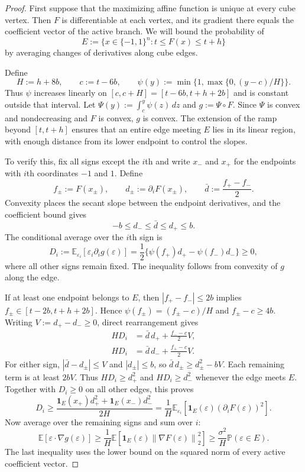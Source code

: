 \documentclass[11pt,letterpaper]{article}
\theoremstyle{remark}
\newcommand{\E}{\mathbb E}
\newcommand{\Pp}{\mathbb P}
\newcommand{\norm}[1]{\left\lVert#1\right\rVert}
\newcommand{\ind}{\mathbf 1}
\begin{document}
\begin{proof}
First suppose that the maximizing affine function is unique at every
cube vertex. Then $F$ is differentiable at each vertex, and its
gradient there equals the coefficient vector of the active branch.
We will bound the probability of
\[
 E:=\{x\in\{-1,1\}^n:t\le F(x)\le t+h\}
\]
by averaging changes of derivatives along cube edges.

Define
\[
 H:=h+8b,\qquad c:=t-6b,\qquad
 \psi(y):=\min\{1,\max\{0,(y-c)/H\}\}.
\]
Thus $\psi$ increases linearly on
$[c,c+H]=[t-6b,t+h+2b]$ and is constant outside that interval.
Let $\Psi(y):=\int_c^y\psi(z)\,dz$ and $g:=\Psi\circ F$.
Since $\Psi$ is convex and nondecreasing and $F$ is convex,
$g$ is convex. The extension of the ramp beyond $[t,t+h]$
ensures that an entire edge meeting $E$ lies in its linear region,
with enough distance from its lower endpoint to control the slopes.

To verify this, fix all signs except the $i$th and write $x_-$
and $x_+$ for the endpoints with $i$th coordinates $-1$ and $1$.
Define
\[
 f_\pm:=F(x_\pm),\qquad
 d_\pm:=\partial_iF(x_\pm),\qquad
 \bar d:=\frac{f_+-f_-}{2}.
\]
Convexity places the secant slope between the endpoint derivatives,
and the coefficient bound gives
\[
 -b\le d_-\le\bar d\le d_+\le b.
\]
The conditional average over the $i$th sign is
\[
 D_i:=\E_{\varepsilon_i}[
       \varepsilon_i\partial_i g(\varepsilon)]
 =\frac12\{\psi(f_+)d_+-\psi(f_-)d_-\}\ge0,
\]
where all other signs remain fixed. The inequality follows from
convexity of $g$ along the edge.

If at least one endpoint belongs to $E$, then
$|f_+-f_-|\le2b$ implies
$f_\pm\in[t-2b,t+h+2b]$. Hence
$\psi(f_\pm)=(f_\pm-c)/H$ and $f_\pm-c\ge4b$.
Writing $V:=d_+-d_-\ge0$, direct rearrangement gives
\[
 \begin{aligned}
 HD_i&=\bar d\,d_++\frac{f_--c}{2}V,\\
 HD_i&=\bar d\,d_-+\frac{f_+-c}{2}V.
 \end{aligned}
\]
For either sign, $|\bar d-d_\pm|\le V$ and $|d_\pm|\le b$,
so $\bar d\,d_\pm\ge d_\pm^2-bV$. Each remaining term is
at least $2bV$. Thus $HD_i\ge d_+^2$ and $HD_i\ge d_-^2$
whenever the edge meets $E$. Together with $D_i\ge0$ on all
other edges, this proves
\[
 D_i\ge\frac{
       \ind_E(x_+)d_+^2+\ind_E(x_-)d_-^2}{2H}
 =\frac1H\E_{\varepsilon_i}
       [\ind_E(\varepsilon)(\partial_iF(\varepsilon))^2].
\]
Now average over the remaining signs and sum over $i$:
\[
 \E[\varepsilon\cdot\nabla g(\varepsilon)]
 \ge\frac1H\E[\ind_E(\varepsilon)
                       \norm{\nabla F(\varepsilon)}_2^2]
 \ge\frac{\sigma^2}{H}\Pp(\varepsilon\in E).
\]
The last inequality uses the lower bound on the squared norm of
every active coefficient vector.


\end{proof}
\end{document}
